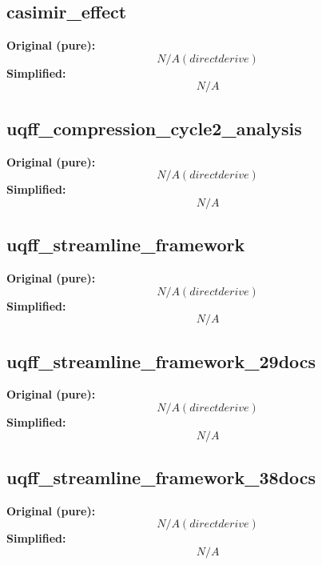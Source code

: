 \subsection{casimir_effect}
\textbf{Original (pure):}
\begin{equation}
N/A (direct derive)
\end{equation}
\textbf{Simplified:}
\begin{equation}
N/A
\end{equation}

\subsection{uqff_compression_cycle2_analysis}
\textbf{Original (pure):}
\begin{equation}
N/A (direct derive)
\end{equation}
\textbf{Simplified:}
\begin{equation}
N/A
\end{equation}

\subsection{uqff_streamline_framework}
\textbf{Original (pure):}
\begin{equation}
N/A (direct derive)
\end{equation}
\textbf{Simplified:}
\begin{equation}
N/A
\end{equation}

\subsection{uqff_streamline_framework_29docs}
\textbf{Original (pure):}
\begin{equation}
N/A (direct derive)
\end{equation}
\textbf{Simplified:}
\begin{equation}
N/A
\end{equation}

\subsection{uqff_streamline_framework_38docs}
\textbf{Original (pure):}
\begin{equation}
N/A (direct derive)
\end{equation}
\textbf{Simplified:}
\begin{equation}
N/A
\end{equation}

